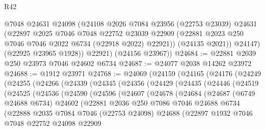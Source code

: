 \begin{lexlean}{R42}
\begin{coremodule}
{            @7048
            @24631
            @24098
            (@24108
              @2026
              @7084
              @23956
              (@22753 @23039)
              @24631
              (@22897
                @2025
                @7046
                @7048
                @22752
                @23039
                @22909
                (@22881 @2023 @250 @7046 @7046 @2022 @6734 (@22918 @2022) @22921))
              (@24135 @2021))
            @24147)
          (@22925 @23965 @1928))
        @22921)
      (@24156 @23967))
@24684 := @22881 @2039 @250 @23973 @7046 @24602 @6734
@24687 := @24077 @2038 @14262 @23972
@24688 := @1912 @23971
@24768 := @24069
    (@24159
      (@24165
        (@24176
          (@24249
            (@24255
              (@24266
                (@24339
                  (@24345
                    (@24356
                      (@24429
                        (@24435
                          (@24446
                            (@24519
                              (@24525
                                (@24536
                                  (@24590
                                    (@24596
                                      (@24607
                                        (@24678
                                          (@24684
                                            (@24687
                                              (@6749 @24688 @6734)
                                              @24602
                                              (@22881
                                                @2036
                                                @250
                                                @7086
                                                @7046
                                                @24688
                                                @6734
                                                (@22888
                                                  @2035
                                                  @7084
                                                  @7046
                                                  (@22753 @24098)
                                                  @24688
                                                  (@22897
                                                    @1932
                                                    @7046
                                                    @7048
                                                    @22752
                                                    @24098
                                                    @22909
}
\end{coremodule}
\end{lexlean}
